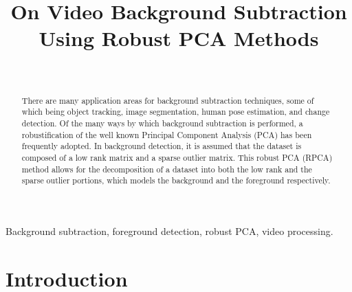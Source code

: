 \documentclass[conference]{IEEEtran}
\begin{document}
\title{On Video Background Subtraction Using Robust PCA Methods}

\author{
\\
}

\maketitle


\begin{abstract}
There are many application areas for background subtraction techniques, some of which being object tracking, image segmentation, human pose estimation, and change detection. Of the many ways by which background subtraction is performed, a robustification of the well known Principal Component Analysis (PCA) has been frequently adopted. In background detection, it is assumed that the dataset is composed of a low rank matrix and a sparse outlier matrix. This robust PCA (RPCA) method allows for the decomposition of a dataset into both the low rank and the sparse outlier portions, which models the background and the foreground respectively.

 
\end{abstract}
\hfill

\begin{IEEEkeywords}
Background subtraction, foreground detection, robust PCA, video processing.
\end{IEEEkeywords}

\section{Introduction}
\end{document}
